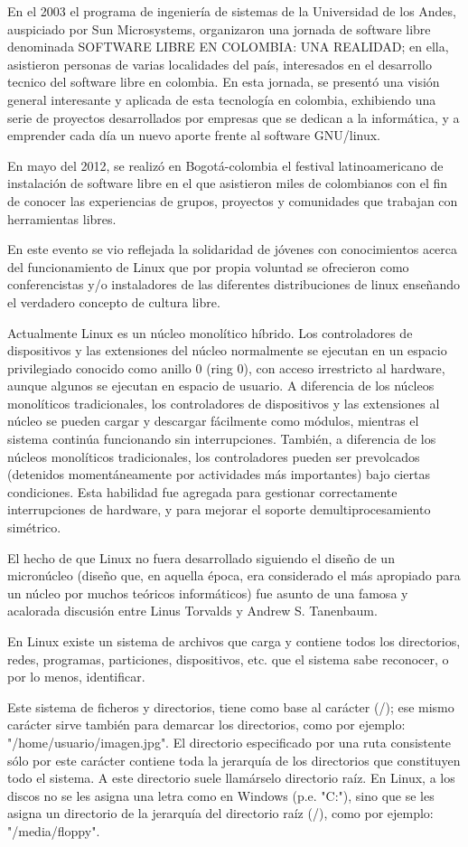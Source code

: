 En el 2003 el programa de ingeniería de sistemas de la
Universidad de los Andes, auspiciado por Sun Microsystems,
organizaron una jornada de software libre denominada
SOFTWARE LIBRE EN COLOMBIA: UNA REALIDAD; en ella,
asistieron personas de varias localidades del país, interesados
en el desarrollo tecnico del software libre en colombia. En esta
jornada, se presentó una visión general interesante y aplicada
de esta tecnología en colombia, exhibiendo una serie de
proyectos desarrollados por empresas que se dedican a la
informática, y a emprender cada día un nuevo aporte frente al
software GNU/linux.

En mayo del 2012, se realizó en Bogotá-colombia el festival
latinoamericano de instalación de software libre en el que
asistieron miles de colombianos con el fin de conocer las
experiencias de grupos, proyectos y comunidades que trabajan
con herramientas libres.

En este evento se vio reflejada la solidaridad de jóvenes con
conocimientos acerca del funcionamiento de Linux que por
propia voluntad se ofrecieron como conferencistas y/o
instaladores de las diferentes distribuciones de linux enseñando
el verdadero concepto de cultura libre.

Actualmente Linux es un núcleo monolítico híbrido. Los
controladores de dispositivos y las extensiones del núcleo
normalmente se ejecutan en un espacio privilegiado conocido
como anillo 0 (ring 0), con acceso irrestricto al hardware,
aunque algunos se ejecutan en espacio de usuario. A diferencia
de los núcleos monolíticos tradicionales, los controladores de
dispositivos y las extensiones al núcleo se pueden cargar y
descargar fácilmente como módulos, mientras el sistema
continúa funcionando sin interrupciones. También, a diferencia
de los núcleos monolíticos tradicionales, los controladores
pueden ser prevolcados (detenidos momentáneamente por
actividades más importantes) bajo ciertas condiciones. Esta
habilidad fue agregada para gestionar correctamente
interrupciones de hardware, y para mejorar el soporte
demultiprocesamiento simétrico.

El hecho de que Linux no fuera desarrollado siguiendo el diseño
de un micronúcleo (diseño que, en aquella época, era
considerado el más apropiado para un núcleo por muchos
teóricos informáticos) fue asunto de una famosa y acalorada
discusión entre Linus Torvalds y Andrew S. Tanenbaum.

En Linux existe un sistema de archivos que carga y contiene
todos los directorios, redes, programas, particiones, dispositivos,
etc. que el sistema sabe reconocer, o por lo menos, identificar.

Este sistema de ficheros y directorios, tiene como base al
carácter (/); ese mismo carácter sirve también para demarcar los
directorios, como por ejemplo: "/home/usuario/imagen.jpg". El
directorio especificado por una ruta consistente sólo por este
carácter contiene toda la jerarquía de los directorios que
constituyen todo el sistema. A este directorio suele llamárselo
directorio raíz. En Linux, a los discos no se les asigna una letra
como en Windows (p.e. "C:"), sino que se les asigna un directorio
de la jerarquía del directorio raíz (/), como por ejemplo:
"/media/floppy".





